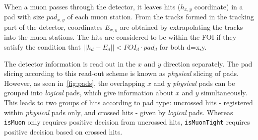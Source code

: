 When a muon passes through the detector, it leaves hits ($h_{x,y}$ coordinate) in a pad with size $pad_{x,y}$ of each muon station. From the tracks formed in the tracking part of the detector, coordinates $E_{x,y}$ are obtained by extrapolating the tracks into the muon stations. The hits are considered to be within the \gls{FOI} if they satisfy the condition that $|| h_{d} - E_{d} || < FOI_{d} \cdot pad_{d}$ for both d={x,y}. 

\color{black}

The detector information is read out in the $x$ and $y$ direction separately. The pad slicing according to this read-out scheme is known as \textit{physical} slicing of pads. However, as seen in~\autoref{fig:pads}, the overlapping $x$ and $y$ \textit{physical} pads can be grouped into \textit{logical} pads, which give information about $x$ and $y$ simultaneously. This leads to two groups of hits according to pad type: uncrossed hits - registered within \textit{physical} pads only, and crossed hits - given by \textit{logical} pads. Whereas \texttt{isMuon} only requires positive decision from uncrossed hits, \texttt{isMuonTight} requires positive decision based on crossed hits. 


